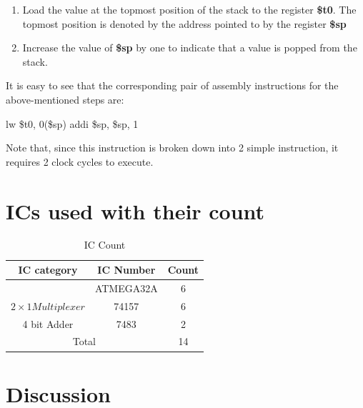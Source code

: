 \documentclass{article}
\begin{document}
\begin{enumerate}
			\begin{enumerate}
				\item Load the value at the topmost position of the stack to the register \textbf{\$t0}. The topmost position is denoted by the address pointed to by the register \textbf{\$sp}
				
				\item Increase the value of \textbf{\$sp} by one to indicate that a value is popped from the stack.
				
			\end{enumerate}
			
			It is easy to see that the corresponding pair of assembly instructions for the above-mentioned steps are:
			
				lw \$t0, 0(\$sp) 
				addi \$sp, \$sp, 1
			
			Note that, since this instruction is broken down into 2 simple instruction, it requires 2 clock cycles to execute.
			
			
		\end{enumerate}
		
		
		\newpage
		
		
		
		
		\section{ICs used with their count}
		\begin{table}[h]
			\centering
			\begin{tabular}{|c|c|c|}
				\hline
				\textbf{IC category} & \textbf{IC Number} & \textbf{Count}  \\
				\hline
				{}& ATMEGA32A & 6\\
				\hline
				$ 2\times 1 Multiplexer$ & 74157 & 6\\
				\hline
				4 bit Adder & 7483 & 2\\
				\hline
				\multicolumn{2}{|c|}{Total} & 14
				\\
				\hline
			\end{tabular}
			\caption{IC Count}
			\label{ICs used with their count}
		\end{table}
		
		
		\newpage
		
		
		
		
		\section{Discussion}
		
\end{document}
